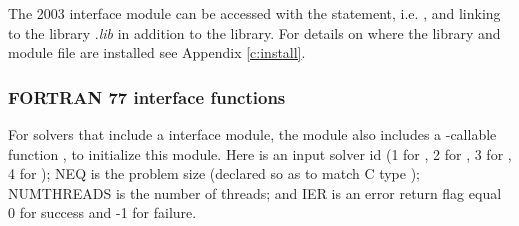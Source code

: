 The {\F} 2003 {\nvecpthreads} interface module can be accessed with the 
statement, i.e. , and linking to the library
.{\em lib} in addition to the {\CC} library.
For details on where the library and module file
 are installed see Appendix \ref{c:install}.

\subsubsection*{FORTRAN 77 interface functions}
For solvers that include a {\F} interface module, the {\nvecpthreads}
module also includes a {\F}-callable function
, to initialize this
module.  Here  is an input solver id
(1 for {\cvode}, 2 for {\ida}, 3 for {\kinsol}, 4 for {\arkode}); NEQ is
the problem size (declared so as to match C type );
NUMTHREADS is the number of threads; and IER is an error return flag
equal 0 for success and -1 for failure.
